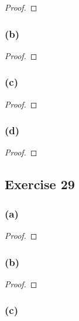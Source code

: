 \documentclass[14pt]{extarticle}
\begin{document}
\begin{proof}

\end{proof}

\subsubsection{(b)}

\begin{proof}

\end{proof}

\subsubsection{(c)}

\begin{proof}

\end{proof}

\subsubsection{(d)}

\begin{proof}

\end{proof}

\subsection{Exercise 29}

\subsubsection{(a)}

\begin{proof}

\end{proof}

\subsubsection{(b)}

\begin{proof}

\end{proof}

\subsubsection{(c)}
\end{document}
